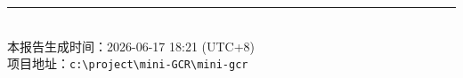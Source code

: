 \documentclass[12pt,a4paper]{article}
\begin{document}
\vspace{2em}
\begin{center}
    \rule{0.4\textwidth}{0.4pt}\\[0.5em]
    {\small 本报告生成时间：2026-06-17 18:21 (UTC+8)\\[0.2em]
    项目地址：\texttt{c:\textbackslash project\textbackslash mini-GCR\textbackslash mini-gcr}}
\end{center}
\end{document}
